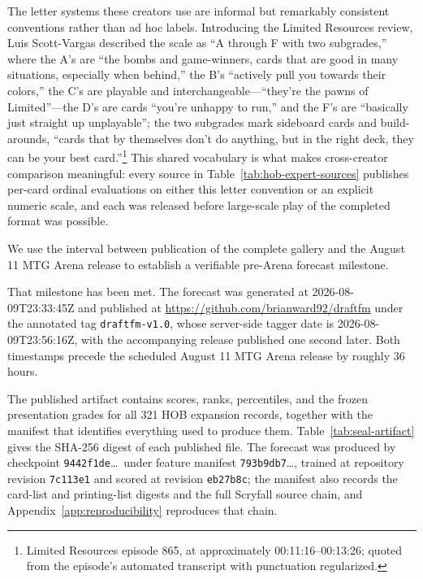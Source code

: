 \documentclass[11pt]{article}
\numberwithin{equation}{section}
\begin{document}
The letter systems these creators use are informal but remarkably consistent conventions rather than ad hoc labels. Introducing the Limited Resources review, Luis Scott-Vargas described the scale as ``A through F with two subgrades,'' where the A's are ``the bombs and game-winners, cards that are good in many situations, especially when behind,'' the B's ``actively pull you towards their colors,'' the C's are playable and interchangeable---``they're the pawns of Limited''---the D's are cards ``you're unhappy to run,'' and the F's are ``basically just straight up unplayable''; the two subgrades mark sideboard cards and build-arounds, ``cards that by themselves don't do anything, but in the right deck, they can be your best card.''\footnote{Limited Resources episode 865, at approximately 00:11:16--00:13:26; quoted from the episode's automated transcript with punctuation regularized.} This shared vocabulary is what makes cross-creator comparison meaningful: every source in Table~\ref{tab:hob-expert-sources} publishes per-card ordinal evaluations on either this letter convention or an explicit numeric scale, and each was released before large-scale play of the completed format was possible.

We use the interval between publication of the complete gallery and the August
11 MTG Arena release to establish a verifiable pre-Arena forecast milestone.

That milestone has been met. The forecast was generated at 2026-08-09T23:33:45Z
and published at \url{https://github.com/brianward92/draftfm} under the annotated
tag \texttt{draftfm-v1.0}, whose server-side tagger date is 2026-08-09T23:56:16Z,
with the accompanying release published one second later. Both timestamps precede
the scheduled August 11 MTG Arena release by roughly 36 hours.

The published artifact contains scores, ranks, percentiles, and the frozen
presentation grades for all 321 HOB expansion records, together with the manifest
that identifies everything used to produce them.
Table~\ref{tab:seal-artifact} gives the SHA-256 digest of each published file.
The forecast was produced by checkpoint \texttt{9442f1de}\ldots\ under feature
manifest \texttt{793b9db7}\ldots, trained at repository revision \texttt{7c113e1}
and scored at revision \texttt{eb27b8c}; the manifest also records the card-list
and printing-list digests and the full Scryfall source chain, and
Appendix~\ref{app:reproducibility} reproduces that chain.
\end{document}
